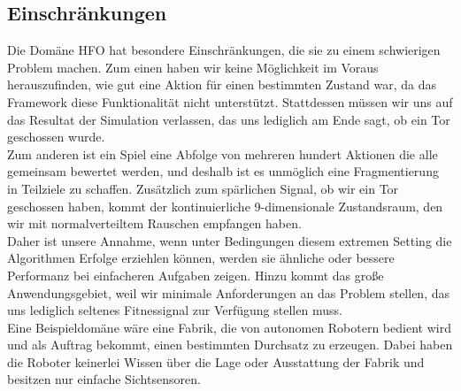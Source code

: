         \subsection{Einschränkungen}
            Die Domäne HFO hat besondere Einschränkungen, die sie zu einem schwierigen Problem machen. Zum einen haben wir keine Möglichkeit im Voraus herauszufinden, wie gut eine Aktion für einen bestimmten Zustand war, da das Framework diese Funktionalität nicht unterstützt. Stattdessen müssen wir uns auf das Resultat der Simulation verlassen, das uns lediglich am Ende sagt, ob ein Tor geschossen wurde. \\[2mm]
            \noindent
            Zum anderen ist ein Spiel eine Abfolge von mehreren hundert Aktionen die alle gemeinsam bewertet werden, und deshalb ist es unmöglich eine Fragmentierung in Teilziele zu schaffen. Zusätzlich zum spärlichen Signal, ob wir ein Tor geschossen haben, kommt der kontinuierliche 9-dimensionale Zustandsraum, den wir mit normalverteiltem Rauschen empfangen haben.\\[2mm]
            \noindent
            Daher ist unsere Annahme, wenn unter Bedingungen diesem extremen Setting die Algorithmen Erfolge erziehlen können, werden sie ähnliche oder bessere Performanz bei einfacheren Aufgaben zeigen. Hinzu kommt das große Anwendungsgebiet, weil wir minimale Anforderungen an das Problem stellen, das uns lediglich seltenes Fitnessignal zur Verfügung stellen muss. \\[2mm]
            \noindent
            Eine Beispieldomäne wäre eine Fabrik, die von autonomen Robotern bedient wird und als Auftrag bekommt, einen bestimmten Durchsatz zu erzeugen. Dabei haben die Roboter keinerlei Wissen über die Lage oder Ausstattung der Fabrik und besitzen nur einfache Sichtsensoren.


